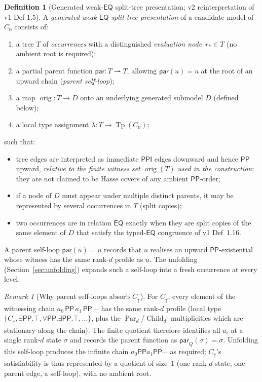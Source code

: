 \documentclass[11pt]{article}
\theoremstyle{definition}
\newtheorem{definition}[theorem]{Definition}
\theoremstyle{remark}
\newtheorem{remark}[theorem]{Remark}
\newcommand{\PP}{\mathsf{PP}}
\newcommand{\PPI}{\mathsf{PPI}}
\newcommand{\EQ}{\mathsf{EQ}}
\newcommand{\Tp}{\operatorname{Tp}}
\newcommand{\Child}{\operatorname{Child}}
\newcommand{\Par}{\operatorname{Par}}
\newcommand{\orig}{\operatorname{orig}}
\begin{document}
\begin{definition}[Generated weak-$\EQ$ split-tree presentation;
  v2 reinterpretation of v1 Def 1.5]\label{def:gen-split-tree}
A \emph{generated weak-$\EQ$ split-tree presentation} of a candidate
model of $C_0$ consists of:
\begin{enumerate}[label=(\roman*)]
  \item a tree $T$ of \emph{occurrences} with a distinguished
    \emph{evaluation node}~$r_\ast \in T$ (no ambient root is
    required);
  \item a partial parent function
    $\mathsf{par} : T \rightharpoonup T$, allowing
    $\mathsf{par}(u) = u$ at the root of an upward chain
    (\emph{parent self-loop});
  \item a map $\orig : T \to D$ onto an underlying generated
    submodel $D$ (defined below);
  \item a local type assignment $\lambda : T \to \Tp(C_0)$;
\end{enumerate}
such that:
\begin{itemize}
  \item tree edges are interpreted as immediate $\PPI$ edges
    downward and hence $\PP$ upward, \emph{relative to the
    finite witness set $\orig(T)$ used in the construction}; they
    are not claimed to be Hasse covers of any ambient $\PP$-order;
  \item if a node of $D$ must appear under multiple distinct
    parents, it may be represented by several occurrences in $T$
    (split copies);
  \item two occurrences are in relation $\EQ$ exactly when they
    are split copies of the same element of $D$ that satisfy the
    typed-$\EQ$ congruence of v1 Def~1.16.
\end{itemize}
A parent self-loop $\mathsf{par}(u) = u$ records that $u$
realises an upward $\PP$-existential whose witness has the same
rank-$d$ profile as $u$. The unfolding (Section~\ref{sec:unfolding})
expands such a self-loop into a fresh occurrence at every level.
\end{definition}

\begin{remark}[Why parent self-loops absorb $C_\uparrow$]
For $C_\uparrow$, every element of the witnessing chain
$a_0 \,\PP\, a_1 \,\PP\, \cdots$ has the same rank-$d$ profile
(local type $\{C_\uparrow, \exists\PP.\top, \forall\PP.\exists\PP.\top, \ldots\}$, plus the
$\Par_d$/$\Child_d$ multiplicities which are stationary along the
chain). The finite quotient therefore identifies all $a_i$ at a
single rank-$d$ state $\sigma$ and records the parent function as
$\mathsf{par}_Q(\sigma) = \sigma$. Unfolding this self-loop
produces the infinite chain $a_0 \PP a_1 \PP \cdots$ as required;
$C_\uparrow$'s satisfiability is thus represented by a quotient of
size~$1$ (one rank-$d$ state, one parent edge, a self-loop), with
no ambient root.
\end{remark}
\end{document}
